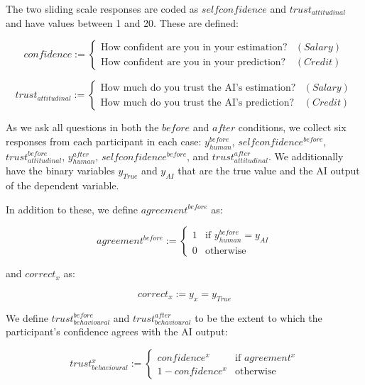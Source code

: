 \noindent The two sliding scale responses are coded as $selfconfidence$ and $trust_{attitudinal}$ and have values between 1 and 20. These are defined:

\begin{equation}
    confidence := \begin{cases}
        \text{How confident are you in your estimation?} & (Salary) \\
        \text{How confident are you in your prediction?} & (Credit)
    \end{cases}
\end{equation}

\begin{equation}
    trust_{attitudinal} := \begin{cases}
        \text{How much do you trust the AI's estimation?} & (Salary) \\
        \text{How much do you trust the AI's prediction?} & (Credit)
    \end{cases}
\end{equation}

As we ask all questions in both the $before$ and $after$ conditions, we collect six responses from each participant in each case: $y_{human}^{before}$, $selfconfidence^{before}$, $trust_{attitudinal}^{before}$, $y_{human}^{after}$, $selfconfidence^{before}$, and $trust_{attitudinal}^{after}$.  We additionally have the binary variables $y_{True}$ and $y_{AI}$ that are the true value and the AI output of the dependent variable.

In addition to these, we define $agreement^{before}$ as:

\begin{equation}
    agreement^{before} := \begin{cases}
        1 & \text{if } y_{human}^{before} = y_{AI} \\
        0 & \text{otherwise}
    \end{cases}
\end{equation}

\noindent and $correct_{x}$ as:

\begin{equation}
    correct_{x} := y_{x} = y_{True}
\end{equation}

We define $trust_{behavioural}^{before}$ and $trust_{behavioural}^{after}$ to be the extent to which the participant's confidence agrees with the AI output:

\begin{equation}
    trust_{behavioural}^{x} := \begin{cases}
        confidence^{x}      & \text{if } agreement^{x} \\
        1-confidence^{x}    & \text{otherwise}
    \end{cases}
\end{equation}

